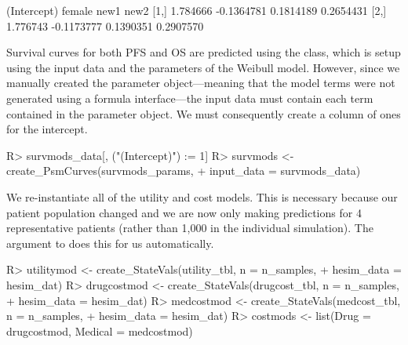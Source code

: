 \documentclass[article, nojss]{jss}\usepackage[]{graphicx}\usepackage[]{color}
\begin{document}
\begin{Schunk}
\begin{Soutput}
     (Intercept)     female      new1      new2
[1,]    1.784666 -0.1364781 0.1814189 0.2654431
[2,]    1.776743 -0.1173777 0.1390351 0.2907570
\end{Soutput}
\end{Schunk}

Survival curves for both PFS and OS are predicted using the  class, which is setup using the input data and the parameters of the Weibull model. However, since we manually created the parameter object---meaning that the model terms were not generated using a formula interface---the input data must contain each term contained in the parameter object. We must consequently create a column of ones for the intercept.

\begin{Schunk}
\begin{Sinput}
R> survmods_data[, ("(Intercept)") := 1]
R> survmods <- create_PsmCurves(survmods_params, 
+                               input_data = survmods_data)
\end{Sinput}
\end{Schunk}

We re-instantiate all of the utility and cost models. This is necessary because our patient population changed and we are now only making predictions for 4 representative patients (rather than 1,000 in the individual simulation). The  argument to  does this for us automatically. 

\begin{Schunk}
\begin{Sinput}
R> utilitymod <- create_StateVals(utility_tbl, n = n_samples, 
+                                 hesim_data = hesim_dat)
R> drugcostmod <- create_StateVals(drugcost_tbl, n = n_samples, 
+                                  hesim_data = hesim_dat)
R> medcostmod <- create_StateVals(medcost_tbl, n = n_samples, 
+                                 hesim_data = hesim_dat)
R> costmods <- list(Drug = drugcostmod, Medical = medcostmod)
\end{Sinput}
\end{Schunk}
\end{document}
